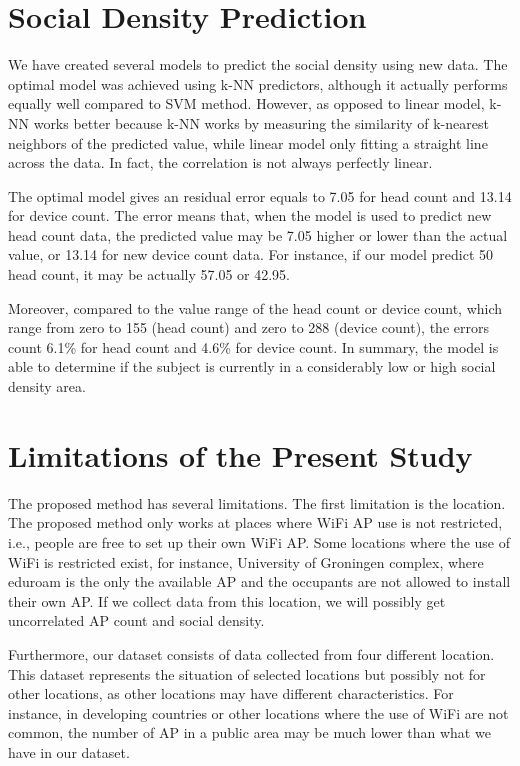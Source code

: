 \section{Social Density Prediction} %
\label{sec:social_density_prediction}
We have created several models to predict the social density using new data. The optimal model was achieved using \ac{k-NN} predictors, although it actually performs equally well compared to \ac{SVM} method. However, as opposed to linear model, \ac{k-NN} works better because \ac{k-NN} works by measuring the similarity of k-nearest neighbors of the predicted value, while linear model only fitting a straight line across the data. In fact, the correlation is not always perfectly linear.

The optimal model gives an residual error equals to 7.05 for head count and 13.14 for device count. The error means that, when the model is used to predict new head count data, the predicted value may be 7.05 higher or lower than the actual value, or 13.14 for new device count data. For instance, if our model predict 50 head count, it may be actually 57.05 or 42.95.

Moreover, compared to the value range of the head count or device count, which range from zero to 155 (head count) and zero to 288 (device count), the errors count 6.1\% for head count and 4.6\% for device count. In summary, the model is able to determine if the subject is currently in a considerably low or high social density area.

\section{Limitations of the Present Study}
\label{sec:limitation_of_the_present_study}
The proposed method has several limitations.
The first limitation is the location. The proposed method only works at places where WiFi \ac{AP} use is not restricted, i.e., people are free to set up their own WiFi \ac{AP}. Some locations where the use of WiFi is restricted exist, for instance, University of Groningen complex, where eduroam is the only the available \ac{AP} and the occupants are not allowed to install their own \ac{AP}. If we collect data from this location, we will possibly get uncorrelated \ac{AP} count and social density.

Furthermore, our dataset consists of data collected from four different location. This dataset represents the situation of selected locations but possibly not for other locations, as other locations may have different characteristics. For instance, in developing countries or other locations where the use of WiFi are not common, the number of \ac{AP} in a public area may be much lower than what we have in our dataset.

